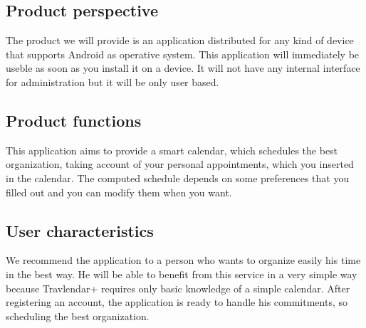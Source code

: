 \subsection{Product perspective} 
The product we will provide is an application distributed for any kind of device that supports Android as operative system. This application will immediately be useble as soon as you install it on a device.
It will not have any internal interface for administration but it will be only user based.

\begin{figure}[!h]
	\centering
\end{figure}

\subsection{Product functions}
This application aims to provide a smart calendar, which schedules the best organization, taking account of your personal appointments, which you inserted in the calendar. The computed schedule depends on some preferences that you filled out and you can modify them when you want.
\subsection{User characteristics}
We recommend the application to a person who wants to organize easily his time in the best way. He will be able to benefit from this service in a very simple way because Travlendar+ requires only basic knowledge of a simple calendar. After registering an account, the application is ready to handle his commitments, so scheduling the best organization.
